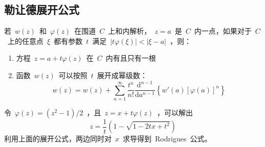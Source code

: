\documentclass[12pt,a4paper]{article}
\newcommand\dif{\mathrm{d}}
\renewcommand{\[}{\ $\displaystyle}
\renewcommand{\]}{$\ }%
\newcommand{\summ}[2][n]{\sum_{#1=#2}^\infty}
\begin{document}
	\subsection{勒让德展开公式}
		若\[w(z)\]和\[\varphi(z)\]在围道\[C\]上和内解析，\[z=a\]是\[C\]内一点，如果对于\[C\]上的任意点\[\xi\]都有参数\[t\]满足\[|t\varphi(\xi)|<|\xi - a|\]，则：
		\begin{enumerate}
			\item 方程\[z=a+t\varphi(z)\]在\[C\]内有且只有一根
			\item 函数\[w(z)\]可以按照\[t\]展开成幂级数：
				$$
				  w(z) = w(z) + \summ{1}\frac{t^n}{n!}\frac{\dif^{n-1}}{\dif a^{n-1}}\left\{w'(a)[\varphi(a)]^n\right\}
				$$
		\end{enumerate}
		
		令\[\varphi(z) = (z^2-1)/2\]，且\[z = x+t\varphi(z)\]，可以解出
		$$
		  z = \frac{1}{t}\left(1-\sqrt{1-2tx+t^2}\right)
		$$
		利用上面的展开公式，两边同时对\[x\]求导得到~Rodrigues~公式。
\end{document}
